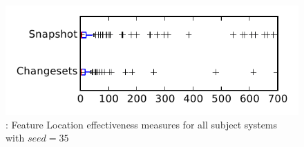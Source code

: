 
\begin{figure}
\centering
\includegraphics[height=0.4\textheight]{figures/flt_seed/rq1_tiny_35}
\caption{\rone: Feature Location effectiveness measures for all subject systems with $seed=35$}
\label{fig:flt_seed:rq1:tiny}
\end{figure}
